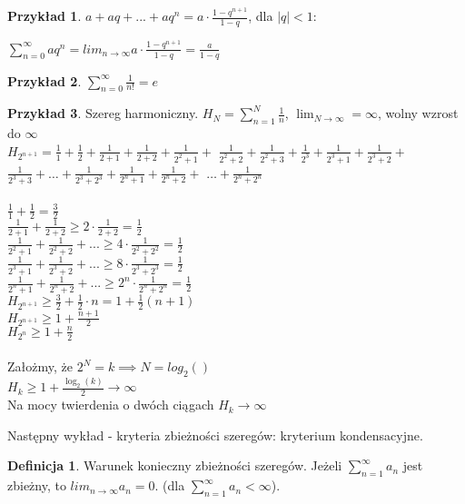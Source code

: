 \documentclass{article}
\theoremstyle{definition}
\newtheorem{de}{Definicja}[subsection]
\theoremstyle{definition}
\theoremstyle{definition}
\newtheorem{pk}{Przykład}[subsection]
\theoremstyle{definition}
\begin{document}
\begin{pk}
    $a+aq+...+aq^n=a\cdot \frac{1-q^{n+1}}{1-q}$, dla $|q|<1$:
    \begin{center}
    $\sum_{n=0}^{\infty} aq^n = lim_{n\rightarrow \infty} a\cdot \frac{1-q^{n+1}}{1-q} = \frac{a}{1-q}$
    \end{center}
\end{pk}

\begin{pk}
    $\sum_{n=0}^{\infty} \frac{1}{n!} = e$
\end{pk}

\begin{pk}
Szereg harmoniczny.
$H_N = \sum_{n=1}^{N} \frac{1}{n}$, $\lim_{N\rightarrow \infty}=\infty$, wolny wzrost do $\infty$\\
$H_{2^{n+1}}=\frac{1}{1} + \frac{1}{2} + \frac{1}{2+1} + \frac{1}{2+2} + \frac{1}{2^2 + 1} +$
$\frac{1}{2^2+2} + \frac{1}{2^2+3} + \frac{1}{2^3} + \frac{1}{2^3+1} + \frac{1}{2^3 + 2} +$
$\frac{1}{2^3 + 3} + \dots + \frac{1}{2^3 + 2^3} + \frac{1}{2^n + 1} + \frac{1}{2^n + 2} +$
$\dots + \frac{1}{2^n+2^n}$\\\\
$\frac{1}{1}+\frac{1}{2}=\frac{3}{2}$\\
$\frac{1}{2+1}+\frac{1}{2+2}\geq 2\cdot \frac{1}{2+2}=\frac{1}{2}$\\
$\frac{1}{2^2+1}+\frac{1}{2^2+2} + ... \geq 4\cdot \frac{1}{2^2 + 2^2}=\frac{1}{2}$\\
$\frac{1}{2^3+1}+\frac{1}{2^3+2} + ... \geq 8\cdot \frac{1}{2^3 + 2^3}=\frac{1}{2}$\\
$\frac{1}{2^n+1}+\frac{1}{2^n+2} + ... \geq 2^{n}\cdot \frac{1}{2^n + 2^n}=\frac{1}{2}$\\
$H_{2^{n+1}}\geq \frac{3}{2} + \frac{1}{2} \cdot n = 1 + \frac{1}{2} (n+1)$\\
$H_{2^{n+1}}\geq 1 + \frac{n+1}{2}$\\
$H_{2^n}\geq 1 + \frac{n}{2}$\\\\
Założmy, że $2^N=k \implies N=log_2()$\\
$H_{k}\geq 1 + \frac{\log_2(k)}{2} \rightarrow \infty$\\
Na mocy twierdenia o dwóch ciągach $H_k \rightarrow \infty$
\end{pk}

Następny wykład - kryteria zbieżności szeregów: kryterium kondensacyjne.

\begin{de}
    Warunek konieczny zbieżności szeregów. Jeżeli $\sum_{n=1}^{\infty} a_n$ jest zbieżny, to $lim_{n\rightarrow \infty} a_n = 0$. (dla $\sum_{n=1}^{\infty} a_n < \infty$).
\end{de}
\end{document}
